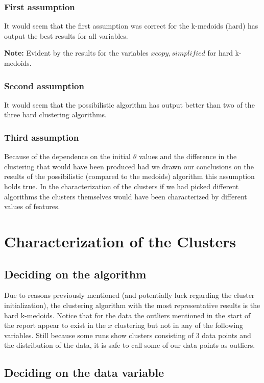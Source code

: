 \documentclass[12pt, a4paper]{article}
\begin{document}
\subsubsection{First assumption}
It would seem that the first assumption was correct for the k-medoids (hard) has output the best results for all variables.
\newline

\textbf{Note: }Evident by the results for the variables $xcopy, simplified$ for hard k-medoids.

\subsubsection{Second assumption}
It would seem that the possibilistic algorithm has output better than two of the three hard clustering algorithms.

\subsubsection{Third assumption}
Because of the dependence on the initial $\theta$ values and the difference in the clustering that would have been produced had we drawn our conclusions on the results of the possibilistic (compared to the medoids) algorithm this assumption holds true. In the characterization of the clusters if we had picked different algorithms the clusters themselves would have been characterized by different values of features. 

\section{Characterization of the Clusters}

\subsection{Deciding on the algorithm}

Due to reasons previously mentioned (and potentially luck regarding the cluster initialization), the clustering algorithm with the most representative results is the hard k-medoids. Notice that for the data the outliers mentioned in the start of the report appear to exist in the $x$ clustering but not in any of the following variables. Still because some runs show clusters consisting of 3 data points and the distribution of the data, it is safe to call some of our data points as outliers.

\subsection{Deciding on the data variable}
\end{document}
